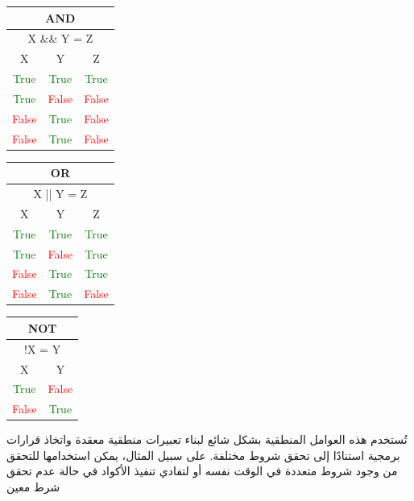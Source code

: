 \begin{table}[h]
  \begin{tabular}{|c|c|c|}
      \hline
      \multicolumn{3}{|c|}{AND}\\ \hline
      \multicolumn{3}{|c|}{X \&\& Y = Z}\\ \hline
      X&Y&Z \\ \hline
      \textcolor{green}{True}&\textcolor{green}{True}&\textcolor{green}{True} \\ \hline
      \textcolor{green}{True}&\textcolor{red}{False}&\textcolor{red}{False} \\ \hline
      \textcolor{red}{False}&\textcolor{green}{True}&\textcolor{red}{False} \\ \hline
      \textcolor{red}{False}&\textcolor{green}{True}&\textcolor{red}{False} \\ \hline
  \end{tabular}
  \hfill
  \begin{tabular}{|c|c|c|}
    \hline
    \multicolumn{3}{|c|}{OR}\\ \hline
    \multicolumn{3}{|c|}{X || Y = Z}\\ \hline
    X&Y&Z \\ \hline
    \textcolor{green}{True}&\textcolor{green}{True}&\textcolor{green}{True} \\ \hline
    \textcolor{green}{True}&\textcolor{red}{False}&\textcolor{green}{True} \\ \hline
    \textcolor{red}{False}&\textcolor{green}{True}&\textcolor{green}{True} \\ \hline
    \textcolor{red}{False}&\textcolor{green}{True}&\textcolor{red}{False} \\ \hline
\end{tabular}
  \hfill
  \begin{tabular}{|c|c|}
    \hline
    \multicolumn{2}{|c|}{NOT}\\ \hline
    \multicolumn{2}{|c|}{!X = Y}\\ \hline
    X&Y \\ \hline
    \textcolor{green}{True}&\textcolor{red}{False} \\ \hline
    \textcolor{red}{False}&\textcolor{green}{True} \\ \hline
\end{tabular}
\end{table}

\begin{AR}
تُستخدم هذه العوامل المنطقية بشكل شائع لبناء تعبيرات منطقية معقدة واتخاذ قرارات برمجية استنادًا إلى تحقق شروط مختلفة. على سبيل المثال، يمكن استخدامها للتحقق من وجود شروط متعددة في الوقت نفسه أو لتفادي تنفيذ الأكواد في حالة عدم تحقق شرط معين
\end{AR}
\par

